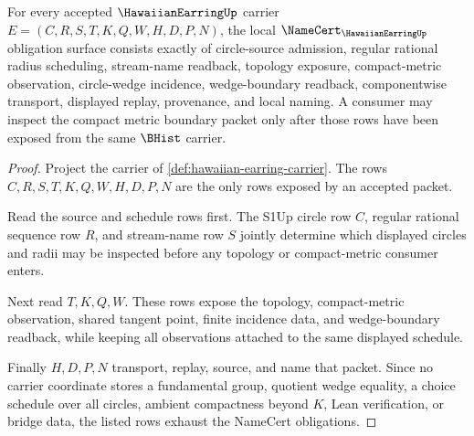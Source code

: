 \begin{theorem}
\label{thm:hawaiian-earring-namecert-obligations}
For every accepted $\HawaiianEarringUp$ carrier $E=(C,R,S,T,K,Q,W,H,D,P,N)$, the local $\NameCert_{\HawaiianEarringUp}$ obligation surface consists exactly of circle-source admission, regular rational radius scheduling, stream-name readback, topology exposure, compact-metric observation, circle-wedge incidence, wedge-boundary readback, componentwise transport, displayed replay, provenance, and local naming. A consumer may inspect the compact metric boundary packet only after those rows have been exposed from the same $\BHist$ carrier.
\end{theorem}
\begin{proof}
Project the carrier of \autoref{def:hawaiian-earring-carrier}. The rows $C,R,S,T,K,Q,W,H,D,P,N$ are the only rows exposed by an accepted packet.

Read the source and schedule rows first. The S1Up circle row $C$, regular rational sequence row $R$, and stream-name row $S$ jointly determine which displayed circles and radii may be inspected before any topology or compact-metric consumer enters.

Next read $T,K,Q,W$. These rows expose the topology, compact-metric observation, shared tangent point, finite incidence data, and wedge-boundary readback, while keeping all observations attached to the same displayed schedule.

Finally $H,D,P,N$ transport, replay, source, and name that packet. Since no carrier coordinate stores a fundamental group, quotient wedge equality, a choice schedule over all circles, ambient compactness beyond $K$, Lean verification, or bridge data, the listed rows exhaust the NameCert obligations.
\end{proof}

